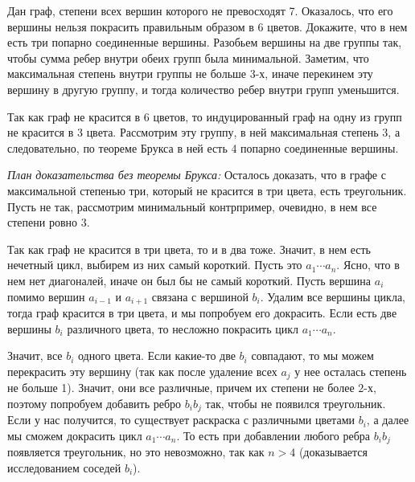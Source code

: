 \problem{}
Дан граф, степени всех вершин которого не превосходят 7.
Оказалось, что его вершины нельзя покрасить правильным образом в 6 цветов.
Докажите, что в нем есть три попарно соединенные вершины.
\solution
Разобьем вершины на две группы так, чтобы сумма ребер внутри обеих групп была
минимальной.
Заметим, что максимальная степень внутри группы не больше 3-х, иначе перекинем
эту вершину в другую группу, и тогда количество ребер внутри групп уменьшится. 
\par
Так как граф не красится в 6 цветов, то индуцированный граф на одну из групп не
красится в 3 цвета. 
Рассмотрим эту группу, в ней максимальная степень 3, а следовательно, по
теореме Брукса в ней есть 4 попарно соединенные вершины.
\par
\emph{План доказательства без теоремы Брукса:}
Осталось доказать, что в графе с максимальной степенью три, который не красится
в три цвета, есть треугольник.
Пусть не так, рассмотрим минимальный контрпример, очевидно, в нем все степени
ровно 3.
\par
Так как граф не красится в три цвета, то и в два тоже.
Значит, в нем есть нечетный цикл, выбирем из них самый короткий.
Пусть это $a_1 \cdots a_n$.
Ясно, что в нем нет диагоналей, иначе он был бы не самый короткий.
Пусть вершина $a_i$ помимо вершин $a_{i-1}$ и $a_{i+1}$ связана с вершиной
$b_i$. Удалим все вершины цикла, тогда граф красится в три цвета, и мы
попробуем его докрасить.
Если есть две вершины $b_i$ различного цвета, то несложно покрасить цикл
$a_1\cdots a_n$.
\par
Значит, все $b_i$ одного цвета.
Если какие-то две $b_i$ совпадают, то мы можем перекрасить эту вершину
(так как после удаление всех $a_j$ у нее осталась степень не больше 1).
Значит, они все различные, причем их степени не более $2$-х, поэтому попробуем
добавить ребро $b_i b_j$ так, чтобы не появился треугольник.
Если у нас получится, то существует раскраска с различными цветами $b_i$, а
далее мы сможем докрасить цикл $a_1 \cdots a_n$.
То есть при добавлении любого ребра $b_i b_j$ появляется треугольник, но это
невозможно, так как $n > 4$ (доказывается исследованием соседей $b_i$).
\endproblem
